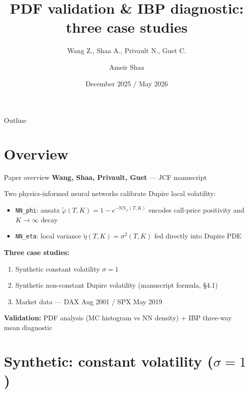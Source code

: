 \documentclass[aspectratio=169,11pt]{beamer}
\title{PDF validation \& IBP diagnostic:\\three case studies}
\subtitle{Wang Z., Shaa A., Privault N., Guet C.}
\author{Ameir Shaa}
\date{December 2025 / May 2026}
\institute{JCF manuscript --- LocalVolatility PINN pipeline}
\begin{document}
\maketitle

\begin{frame}{Outline}
    \tableofcontents
\end{frame}

\section{Overview}

\begin{frame}{Paper overview}
    \textbf{Wang, Shaa, Privault, Guet} --- JCF manuscript
    \vspace{0.3cm}

    Two physics-informed neural networks calibrate Dupire local volatility:
    \begin{itemize}
        \item \texttt{NN\_phi}: ansatz $\tilde\varphi(T,K) = 1 - e^{-\mathrm{NN}_\varphi(T,K)}$ encodes call-price positivity and $K\to\infty$ decay
        \item \texttt{NN\_eta}: local variance $\tilde\eta(T,K) = \sigma^2(T,K)$ fed directly into Dupire PDE
    \end{itemize}

    \vspace{0.3cm}
    \textbf{Three case studies:}
    \begin{enumerate}
        \item Synthetic constant volatility $\sigma = 1$
        \item Synthetic non-constant Dupire volatility (manuscript formula, \S4.1)
        \item Market data --- DAX Aug 2001 / SPX May 2019
    \end{enumerate}
    \vspace{0.25cm}
    \textbf{Validation:} PDF analysis (MC histogram vs NN density) + IBP three-way mean diagnostic
\end{frame}

\section{Synthetic: constant volatility ($\sigma=1$)}
\end{document}
